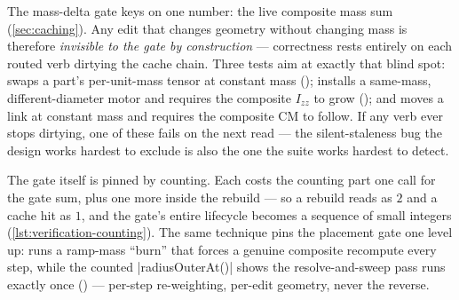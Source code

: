 \begin{keyinsight}
The mass-delta gate keys on one number: the live composite mass sum (\cref{sec:caching}). Any edit
that changes geometry without changing mass is therefore \emph{invisible to the gate by
construction} --- correctness rests entirely on each routed verb dirtying the cache chain. Three
tests aim at exactly that blind spot:  swaps a
part's per-unit-mass tensor at constant mass
(); 
installs a same-mass, different-diameter motor and requires the composite $I_{zz}$ to grow
(); and 
moves a link at constant mass and requires the composite CM to follow. If any verb ever stops
dirtying, one of these fails on the next read --- the silent-staleness bug the design works
hardest to exclude is also the one the suite works hardest to detect.
\end{keyinsight}

The gate itself is pinned by counting. Each  costs the counting part one
 call for the gate sum, plus one more inside the rebuild --- so a rebuild reads as
$2$ and a cache hit as $1$, and the gate's entire lifecycle becomes a sequence of small integers
(\cref{lst:verification-counting}). The same technique pins the placement gate one level up:
 runs a ramp-mass ``burn'' that
forces a genuine composite recompute every step, while the counted
\cppinline|radiusOuterAt()| shows the resolve-and-sweep pass runs exactly once
() --- per-step re-weighting, per-edit
geometry, never the reverse.

